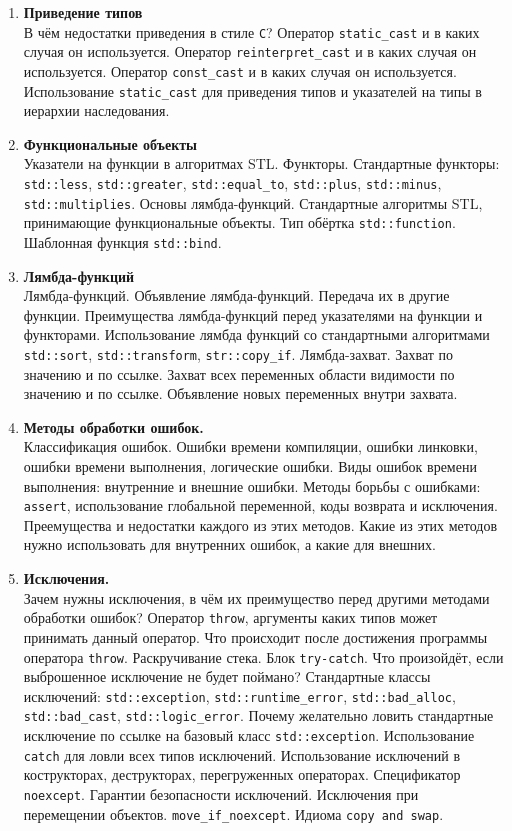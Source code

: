 \documentclass{article}
\begin{document}
\begin{enumerate}
\item \textbf{Приведение типов}\\
В чём недостатки приведения в стиле \texttt{C}? Оператор \texttt{static\_cast} и в каких случая он используется. Оператор \texttt{reinterpret\_cast} и в каких случая он используется. Оператор \texttt{const\_cast} и в каких случая он используется.  Использование \texttt{static\_cast} для приведения типов и указателей на типы в иерархии наследования. 


\item \textbf{Функциональные объекты}\\
Указатели на функции в алгоритмах STL. Функторы. Стандартные функторы: \texttt{std::less}, \texttt{std::greater}, \texttt{std::equal\_to}, \texttt{std::plus}, \texttt{std::minus}, \texttt{std::multiplies}. Основы лямбда-функций. Стандартные алгоритмы STL, принимающие функциональные объекты. Тип обёртка \texttt{std::function}. Шаблонная функция \texttt{std::bind}.

\item \textbf{Лямбда-функций}\\
Лямбда-функций. Объявление лямбда-функций. Передача их в другие функции. Преимущества лямбда-функций перед указателями на функции и функторами. Использование лямбда функций со стандартными алгоритмами \texttt{std::sort}, \texttt{std::transform}, \texttt{str::copy\_if}. Лямбда-захват. Захват по значению и по ссылке. Захват всех переменных области видимости по значению и по ссылке. Объявление новых переменных внутри захвата.


\item \textbf{Методы обработки ошибок.}\\
Классификация ошибок. Ошибки времени компиляции, ошибки линковки, ошибки времени выполнения, логические ошибки.
Виды ошибок времени выполнения: внутренние и внешние ошибки. Методы борьбы с ошибками: \texttt{assert}, использование глобальной переменной, коды возврата и исключения. Преемущества и недостатки каждого из этих методов. Какие из этих методов нужно использовать для внутренних ошибок, а какие для внешних.


\item \textbf{Исключения.}\\
Зачем нужны исключения, в чём их преимущество перед другими методами обработки ошибок?
Оператор \texttt{throw}, аргументы каких типов может принимать данный оператор. Что происходит после достижения программы оператора \texttt{throw}. Раскручивание стека. Блок \texttt{try-catch}. Что произойдёт, если выброшенное исключение не будет поймано? Стандартные классы исключений: \texttt{std::exception}, \texttt{std::runtime\_error}, \texttt{std::bad\_alloc}, \texttt{std::bad\_cast}, \texttt{std::logic\_error}. Почему желательно ловить стандартные исключение по ссылке на базовый класс \texttt{std::exception}. Использование \texttt{catch} для ловли всех типов исключений. Использование исключений в кострукторах, деструкторах, перегруженных операторах. Спецификатор \texttt{noexcept}. Гарантии безопасности исключений. Исключения при перемещении объектов. \texttt{move\_if\_noexcept}. Идиома \texttt{copy and swap}.




\end{enumerate}
\end{document}
